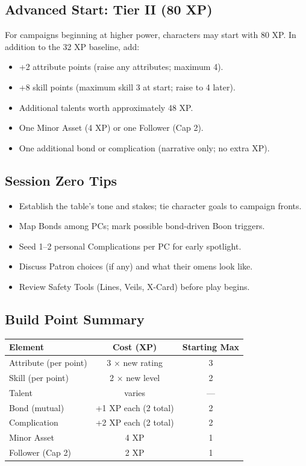 \subsection{Advanced Start: Tier II (80 XP)}

For campaigns beginning at higher power, characters may start with 80 XP. In addition to the 32 XP baseline, add:

\begin{itemize}
  \item +2 attribute points (raise any attributes; maximum 4).
  \item +8 skill points (maximum skill 3 at start; raise to 4 later).
  \item Additional talents worth approximately 48 XP.
  \item One Minor Asset (4 XP) or one Follower (Cap 2).
  \item One additional bond or complication (narrative only; no extra XP).
\end{itemize}

\subsection{Session Zero Tips}

\begin{itemize}
  \item Establish the table's tone and stakes; tie character goals to campaign fronts.
  \item Map Bonds among PCs; mark possible bond-driven Boon triggers.
  \item Seed 1--2 personal Complications per PC for early spotlight.
  \item Discuss Patron choices (if any) and what their omens look like.
  \item Review Safety Tools (Lines, Veils, X-Card) before play begins.
\end{itemize}

\subsection{Build Point Summary}

\begin{tabular}{@{}lcc@{}}
\toprule
\textbf{Element} & \textbf{Cost (XP)} & \textbf{Starting Max} \\
\midrule
Attribute (per point) & 3 × new rating & 3 \\
Skill (per point) & 2 × new level & 2 \\
Talent & varies & --- \\
Bond (mutual) & +1 XP each (2 total) & 2 \\
Complication & +2 XP each (2 total) & 2 \\
Minor Asset & 4 XP & 1 \\
Follower (Cap 2) & 2 XP & 1 \\
\bottomrule
\end{tabular}

